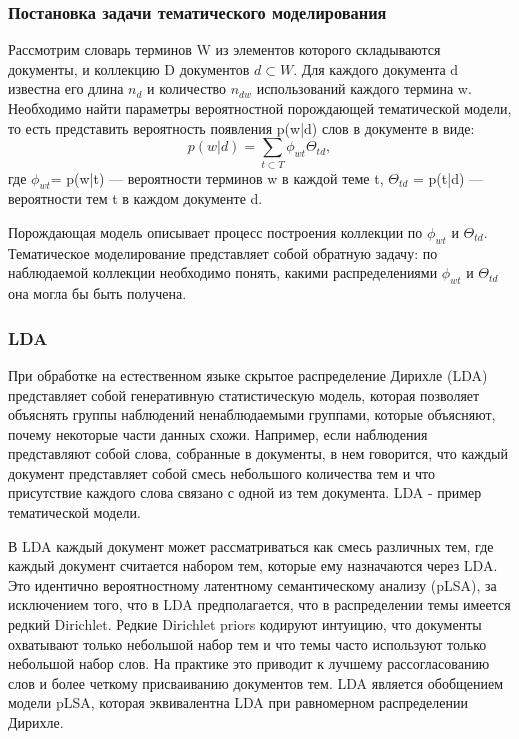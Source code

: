 \documentclass{article}
\begin{document}
\subsubsection{Постановка задачи тематического моделирования}
Рассмотрим  словарь терминов W из элементов которого складываются документы, и коллекцию D документов $d \subset W$.  Для каждого документа d известна его длина $n_{d}$ и количество $n_{dw}$ использований каждого термина w. Необходимо найти параметры вероятностной порождающей тематической модели, то есть представить вероятность появления p(w|d) слов в документе в виде:
\begin{equation}
p(w|d) = \sum\limits_{t \subset T} \phi_{wt}\Theta_{td}, 
\end{equation}
где $\phi_{wt}$= p(w|t) — вероятности терминов w в каждой теме t, $\Theta_{td}$ = p(t|d) — вероятности тем t в каждом документе d.

Порождающая модель описывает процесс построения коллекции по $\phi_{wt}$ и $\Theta_{td}$. Тематическое моделирование представляет собой обратную задачу: по наблюдаемой коллекции необходимо понять, какими распределениями $\phi_{wt}$ и $\Theta_{td}$ она могла бы быть получена.

\subsubsection{LDA}
При обработке на естественном языке скрытое распределение Дирихле (LDA) представляет собой генеративную статистическую модель, которая позволяет объяснять группы наблюдений ненаблюдаемыми группами, которые объясняют, почему некоторые части данных схожи. Например, если наблюдения представляют собой слова, собранные в документы, в нем говорится, что каждый документ представляет собой смесь небольшого количества тем и что присутствие каждого слова связано с одной из тем документа. LDA - пример тематической модели.

В LDA каждый документ может рассматриваться как смесь различных тем, где каждый документ считается набором тем, которые ему назначаются через LDA. Это идентично вероятностному латентному семантическому анализу (pLSA), за исключением того, что в LDA предполагается, что в распределении темы имеется редкий Dirichlet. Редкие Dirichlet priors кодируют интуицию, что документы охватывают только небольшой набор тем и что темы часто используют только небольшой набор слов. На практике это приводит к лучшему рассогласованию слов и более четкому присваиванию документов тем. LDA является обобщением модели pLSA, которая эквивалентна LDA при равномерном распределении Дирихле.
\end{document}
